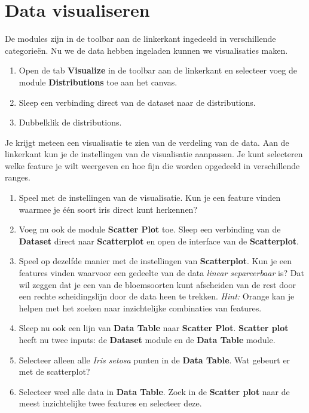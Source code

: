 \documentclass{article}
\newcommand{\tb}[1]{\textbf{#1}}
\begin{document}
\section{Data visualiseren}
De modules zijn in de toolbar aan de linkerkant ingedeeld in verschillende categorie\"en. Nu we de data hebben ingeladen kunnen we visualisaties maken.
\begin{enumerate}
\item Open de tab \tb{Visualize} in de toolbar aan de linkerkant en selecteer voeg de module \tb{Distributions} toe aan het canvas.
\item Sleep een verbinding direct van de dataset naar de distributions.
\item Dubbelklik de distributions.
\end{enumerate}

Je krijgt meteen een visualisatie te zien van de verdeling van de data. Aan de linkerkant kun je de instellingen van de visualisatie aanpassen. Je kunt selecteren welke feature je wilt weergeven en hoe fijn die worden opgedeeld in verschillende ranges. 

\begin{enumerate}[resume]
\item Speel met de instellingen van de visualisatie. Kun je een feature vinden waarmee je \'e\'en soort iris direct kunt herkennen?
\item Voeg nu ook de module \tb{Scatter Plot} toe. Sleep een verbinding van de \tb{Dataset} direct naar \tb{Scatterplot} en open de interface van de \tb{Scatterplot}.
\item Speel op dezelfde manier met de instellingen van \tb{Scatterplot}. Kun je een features vinden waarvoor een gedeelte van de data \textit{linear separeerbaar} is? Dat wil zeggen dat je een van de bloemsoorten kunt afscheiden van de rest door een rechte scheidingslijn door de data heen te trekken. \textit{Hint: }Orange kan je helpen met het zoeken naar inzichtelijke combinaties van features.
\item Sleep nu ook een lijn van \tb{Data Table} naar \tb{Scatter Plot}. \tb{Scatter plot} heeft nu twee inputs: de \tb{Dataset} module en de \tb{Data Table} module.
\item Selecteer alleen alle \textit{Iris setosa} punten in de \tb{Data Table}. Wat gebeurt er met de scatterplot?
\item Selecteer weel alle data in \tb{Data Table}. Zoek in de \tb{Scatter plot} naar de meest inzichtelijke twee features en selecteer deze. 
\end{enumerate}
\end{document}
